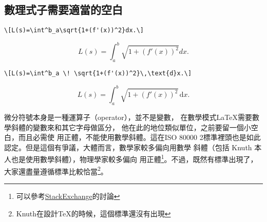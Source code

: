 \subsection{數理式子需要適當的空白}

\begin{Wrong}
\begin{verbatim}
\[L(s)=\int^b_a\sqrt{1+(f'(x))^2}dx.\]
\end{verbatim}
\[L(s)=\int^b_a\sqrt{1+(f'(x))^2}dx.\]
\end{Wrong}

\begin{Right}
\begin{verbatim}
\[L(s)=\int^b_a \! \sqrt{1+(f'(x))^2}\,\text{d}x.\]
\end{verbatim}
\[L(s)=\int^b_a \! \sqrt{1+(f'(x))^2} \, \text{d}x.\]
\end{Right}

微分符號本身是一種運算子（operator），並不是變數，
在數學模式\LaTeX 需要數學斜體的變數來和其它字母做區分，
他在此的地位類似單位，之前要留一個小空白，而且必需使
用正體，不能使用數學斜體。這在ISO 80000 2標準裡頭也是如此
認定。但是這個有爭議，大體而言，數學家較多偏向用數學
斜體（包括 Knuth 本人也是使用數學斜體），物理學家較多偏向
用正體\footnote{可以參考\href{https://tex.stackexchange.com/questions/14821/whats-the-proper-way-to-typeset-a-differential-operator}{\sf StackExchange}的討論}。不過，既然有標準出現了，大家還盡量遵循標準比較恰當\footnote{Knuth在設計\TeX 的時候，這個標準還沒有出現}。

\marginpar{\back}
